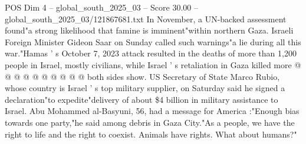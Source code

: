\begin{textsample}{POS Dim 4 – global\_south\_2025\_03 – Score 30.00 – global\_south\_2025\_03/121867681.txt}
In November, a UN-backed assessment found"a strong likelihood that famine is imminent"within northern Gaza.
Israeli Foreign Minister Gideon Saar on Sunday called such warnings"a lie during all this war."Hamas ' s October 7, 2023 attack resulted in the deaths of more than 1,200 people in Israel, mostly civilians, while Israel ' s retaliation in Gaza killed more @ @ @ @ @ @ @ @ @ @ both sides show.
US Secretary of State Marco Rubio, whose country is Israel ' s top military supplier, on Saturday said he signed a declaration"to expedite"delivery of about \$4 billion in military assistance to Israel.
Abu Mohammed al-Basyuni, 56, had a message for America :"Enough bias towards one party,"he said among debris in Gaza City."As a people, we have the right to life and the right to coexist.
Animals have rights.
What about humans?"

\end{textsample}
